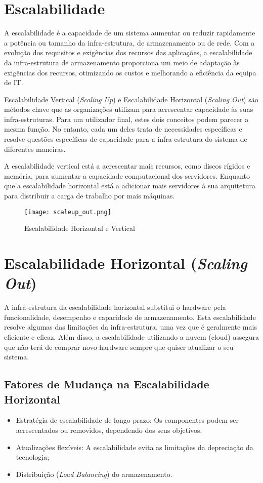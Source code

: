 \section{Escalabilidade}
A escalabilidade é a capacidade de um sistema aumentar ou reduzir rapidamente a potência ou tamanho da infra-estrutura, de armazenamento ou de rede. Com a evolução dos requisitos e exigências dos recursos das aplicações, a escalabilidade da infra-estrutura de armazenamento proporciona um meio de adaptação às exigências dos recursos, otimizando os custos e melhorando a eficiência da equipa de \ac{IT}.

Escalabilidade Vertical (\textit{Scaling Up}) e Escalabilidade Horizontal (\textit{Scaling Out}) são métodos chave que as organizações utilizam para acrescentar capacidade às suas infra-estruturas. Para um utilizador final, estes dois conceitos podem parecer a mesma função. No entanto, cada um deles trata de necessidades específicas e resolve questões específicas de capacidade para a infra-estrutura do sistema de diferentes maneiras.

A escalabilidade vertical está a acrescentar mais recursos, como discos rígidos e memória, para aumentar a capacidade computacional dos servidores. Enquanto que a escalabilidade horizontal está a adicionar mais servidores à sua arquitetura para distribuir a carga de trabalho por mais máquinas.

\begin{figure}[H]
\center
\texttt{[image: scaleup\_out.png]}
\caption{Escalabilidade Horizontal e Vertical}
\end{figure}

\section{Escalabilidade Horizontal (\textit{Scaling Out})}
A infra-estrutura da escalabilidade horizontal substitui o hardware pela funcionalidade, desempenho e capacidade de armazenamento. Esta escalabilidade resolve algumas das limitações da infra-estrutura, uma vez que é geralmente mais eficiente e eficaz. Além disso, a escalabilidade utilizando a nuvem (cloud) assegura que não terá de comprar novo hardware sempre que quiser atualizar o seu sistema.

\subsection{Fatores de Mudança na Escalabilidade Horizontal}
\begin{itemize}
    \item Estratégia de escalabilidade de longo prazo: Os componentes podem ser acrescentados ou removidos, dependendo dos seus objetivos;
    \item Atualizações flexíveis: A escalabilidade evita as limitações da depreciação da tecnologia;
    \item Distribuição (\textit{Load Balancing}) do armazenamento.
\end{itemize}


